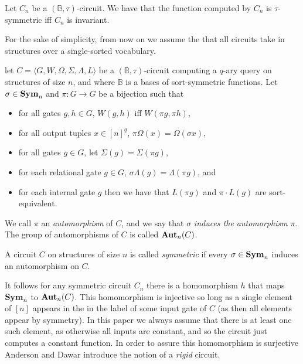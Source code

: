 \documentclass[../paper.tex]{subfiles}
\begin{document}
\begin{lem}
  Let $C_n$ be a $(\mathbb{B}, \tau)$-circuit. We have that the function
  computed by $C_n$ is $\tau$-symmetric iff $C_n$ is invariant.
\end{lem}

For the sake of simplicity, from now on we assume the that all circuits take in
structures over a single-sorted vocabulary.

\begin{definition}[Automorphism]
  let $C = \langle G, W, \Omega, \Sigma, \Lambda, L\rangle$ be a
  $(\mathbb{B},\tau)$-circuit computing a $q$-ary query on structures of size
  $n$, and where $\mathbb{B}$ is a bases of sort-symmetric functions. Let
  $\sigma \in \text{\textbf{Sym}}_n$ and $\pi: G \rightarrow G$ be a bijection such that
  \begin{itemize}
    \setlength\itemsep{0mm}
  \item for all gates $g, h \in G$, $W(g,h)$ iff $W(\pi g, \pi h)$,
  \item for all output tuples $x \in [n]^q$, $\pi \Omega (x) = \Omega (\sigma
    x)$,
  \item for all gates $g \in G$, let $\Sigma (g) = \Sigma (\pi g)$,
  \item for each relational gate $g \in G$, $\sigma \Lambda (g) = \Lambda (\pi
    g)$, and
  \item for each internal gate $g$ then we have that $L(\pi g)$ and $ \pi \cdot
    L(g)$ are sort-equivalent.
  \end{itemize}
  We call $\pi$ an \emph{automorphism} of $C$, and we say that $\sigma$
  \emph{induces the automorphism} $\pi$. The group of automorphisms of $C$ is
  called $\text{\textbf{Aut}}_n (C)$.
\end{definition}

\begin{definition}[Symmetry]
  A circuit $C$ on structures of size $n$ is called \emph{symmetric} if every
  $\sigma \in \text{\textbf{Sym}}_n$ induces an automorphism on $C$.
\end{definition}

It follows for any symmetric circuit $C_n$ there is a homomorphism $h$ that maps
$\text{\textbf{Sym}}_n$ to $\text{\textbf{Aut}}_n(C)$. This homomorphism is injective so long as a single
element of $[n]$ appears in the in the label of some input gate of $C$ (as then
all elements appear by symmetry)\cite{AndersonD17}. In this paper we always
assume that there is at least one such element, as otherwise all inputs are
constant, and so the circuit just computes a constant function. In order to
assure this homomorphism is surjective Anderson and Dawar \cite{AndersonD17}
introduce the notion of a \emph{rigid} circuit.
\end{document}
